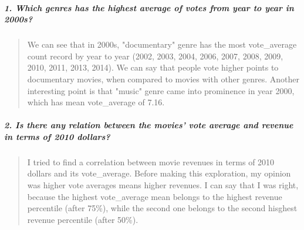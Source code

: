 \documentclass[11pt]{article}
\begin{document}
\subparagraph{1. Which genres has the highest average of votes from year
to year in
2000s?}\label{which-genres-has-the-highest-average-of-votes-from-year-to-year-in-2000s}

\begin{quote}
We can see that in 2000s, "documentary" genre has the most vote\_average
count record by year to year (2002, 2003, 2004, 2006, 2007, 2008, 2009,
2010, 2011, 2013, 2014). We can say that people vote higher points to
documentary movies, when compared to movies with other genres. Another
interesting point is that "music" genre came into prominence in year
2000, which has mean vote\_average of 7.16.
\end{quote}

\subparagraph{2. Is there any relation between the movies' vote average
and revenue in terms of 2010
dollars?}\label{is-there-any-relation-between-the-movies-vote-average-and-revenue-in-terms-of-2010-dollars}

\begin{quote}
I tried to find a correlation between movie revenues in terms of 2010
dollars and its vote\_average. Before making this exploration, my
opinion was higher vote averages means higher revenues. I can say that I
was right, because the highest vote\_average mean belongs to the highest
revenue percentile (after 75\%), while the second one belongs to the
second hisghest revenue percentile (after 50\%).
\end{quote}


    
    
    
    
\end{document}
